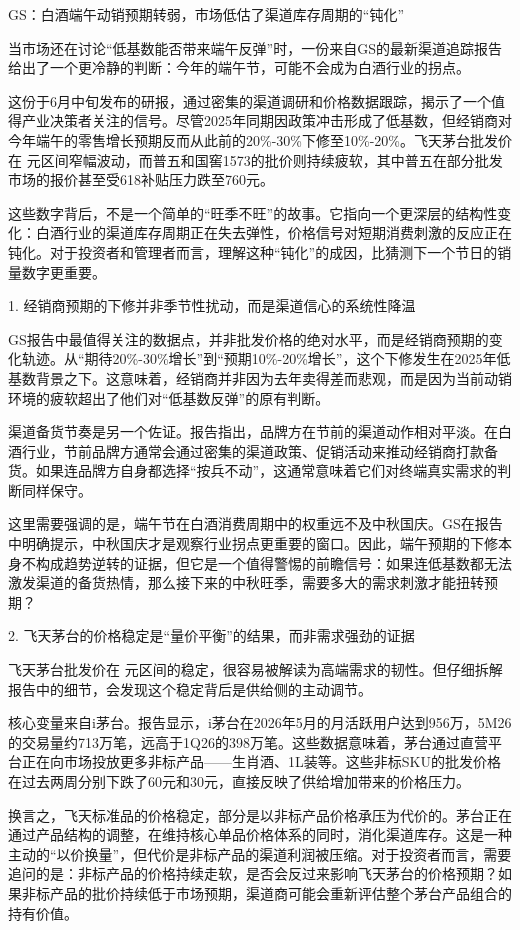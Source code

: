 \documentclass[11pt]{ctexart}
\begin{document}
GS：白酒端午动销预期转弱，市场低估了渠道库存周期的“钝化”

当市场还在讨论“低基数能否带来端午反弹”时，一份来自GS的最新渠道追踪报告给出了一个更冷静的判断：今年的端午节，可能不会成为白酒行业的拐点。

这份于6月中旬发布的研报，通过密集的渠道调研和价格数据跟踪，揭示了一个值得产业决策者关注的信号。尽管2025年同期因政策冲击形成了低基数，但经销商对今年端午的零售增长预期反而从此前的20\%-30\%下修至10\%-20\%。飞天茅台批发价在 元区间窄幅波动，而普五和国窖1573的批价则持续疲软，其中普五在部分批发市场的报价甚至受618补贴压力跌至760元。

这些数字背后，不是一个简单的“旺季不旺”的故事。它指向一个更深层的结构性变化：白酒行业的渠道库存周期正在失去弹性，价格信号对短期消费刺激的反应正在钝化。对于投资者和管理者而言，理解这种“钝化”的成因，比猜测下一个节日的销量数字更重要。

1. 经销商预期的下修并非季节性扰动，而是渠道信心的系统性降温

GS报告中最值得关注的数据点，并非批发价格的绝对水平，而是经销商预期的变化轨迹。从“期待20\%-30\%增长”到“预期10\%-20\%增长”，这个下修发生在2025年低基数背景之下。这意味着，经销商并非因为去年卖得差而悲观，而是因为当前动销环境的疲软超出了他们对“低基数反弹”的原有判断。

渠道备货节奏是另一个佐证。报告指出，品牌方在节前的渠道动作相对平淡。在白酒行业，节前品牌方通常会通过密集的渠道政策、促销活动来推动经销商打款备货。如果连品牌方自身都选择“按兵不动”，这通常意味着它们对终端真实需求的判断同样保守。

这里需要强调的是，端午节在白酒消费周期中的权重远不及中秋国庆。GS在报告中明确提示，中秋国庆才是观察行业拐点更重要的窗口。因此，端午预期的下修本身不构成趋势逆转的证据，但它是一个值得警惕的前瞻信号：如果连低基数都无法激发渠道的备货热情，那么接下来的中秋旺季，需要多大的需求刺激才能扭转预期？

2. 飞天茅台的价格稳定是“量价平衡”的结果，而非需求强劲的证据

飞天茅台批发价在 元区间的稳定，很容易被解读为高端需求的韧性。但仔细拆解报告中的细节，会发现这个稳定背后是供给侧的主动调节。

核心变量来自i茅台。报告显示，i茅台在2026年5月的月活跃用户达到956万，5M26的交易量约713万笔，远高于1Q26的398万笔。这些数据意味着，茅台通过直营平台正在向市场投放更多非标产品——生肖酒、1L装等。这些非标SKU的批发价格在过去两周分别下跌了60元和30元，直接反映了供给增加带来的价格压力。

换言之，飞天标准品的价格稳定，部分是以非标产品价格承压为代价的。茅台正在通过产品结构的调整，在维持核心单品价格体系的同时，消化渠道库存。这是一种主动的“以价换量”，但代价是非标产品的渠道利润被压缩。对于投资者而言，需要追问的是：非标产品的价格持续走软，是否会反过来影响飞天茅台的价格预期？如果非标产品的批价持续低于市场预期，渠道商可能会重新评估整个茅台产品组合的持有价值。
\end{document}

